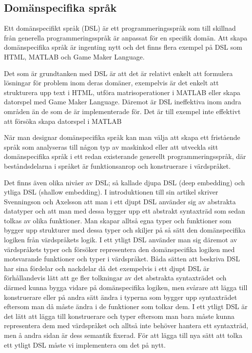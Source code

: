 \documentclass[]{article}
\begin{document}
\subsection{Domänspecifika språk}
Ett domänspecifikt språk (\gls{DSL}) är ett programmeringsspråk som till
skillnad från generella programmeringsspråk är anpassat för en
specifik domän. Att skapa domänspecifika språk är ingenting nytt och det
finns flera exempel på DSL som HTML, MATLAB och Game Maker Language.

Det som är grundtanken med DSL är att det är relativt enkelt att formulera lösningar
för problem inom deras domäner, exempelvis är det enkelt att strukturera upp text i
HTML, utföra matrisoperationer i MATLAB eller skapa datorspel med Game Maker Language.
Däremot är DSL ineffektiva inom andra områden än de som de är implementerade för.
Det är till exempel inte effektivt att försöka skapa datorspel i MATLAB

När man designar domänspecifika språk kan man välja att skapa ett fristående
språk som analyseras till någon typ av maskinkod eller att utveckla sitt
domänspecifika språk i ett redan existerande generellt programmeringsspråk,
där beståndsdelarna i språket är funktionsanrop och konstruerare i värdspråket.

Det finns även olika nivåer av DSL; så kallade djupa DSL (deep embedding) och
ytliga DSL (shallow embedding). I introduktionen till sin artikel skriver
Svenningson och Axelsson \cite{Svenningsson2013} att man i ett djupt
DSL använder sig av abstrakta datatyper och att man med dessa bygger upp ett
abstrakt syntaxträd som sedan tolkas av olika funktioner.
Man skapar alltså egna typer och funktioner som bygger upp strukturer med dessa
typer och skiljer på så sätt den domänspecifika logiken från värdspråkets logik.
I ett ytligt DSL använder man sig däremot av värdspråkets typer och försöker
representera den domänspecifika logiken med motsvarande funktioner och
typer i värdspråket.
Båda sätten att beskriva DSL har sina fördelar och nackdelar då det exempelvis
i ett djupt DSL är förhållandevis lätt att ge fler tolkningar av det abstrakta
syntaxträdet och därmed kunna bygga vidare på domänspecifika logiken,
men svårare att lägga till konstruerare eller på andra sätt ändra i typerna som
bygger upp syntaxträdet eftersom man då måste ändra i de funktioner som tolkar
dem. I ett ytligt DSL är det lätt att lägga till konstruerare och typer
eftersom man bara måste kunna representera dem med värdspråket och alltså inte
behöver hantera ett syntaxträd, men å andra sidan är dess semantik fixerad.
För att lägga till nya sätt att tolka ett ytligt DSL måste vi implementera
om det på nytt.
\end{document}
